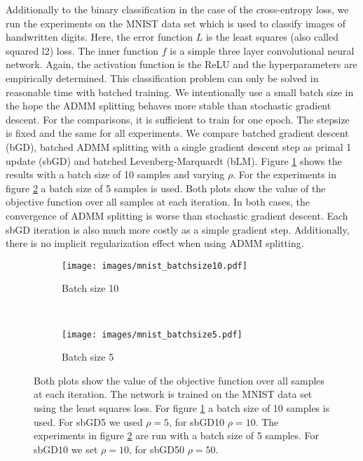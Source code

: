 \documentclass[english,11pt,a4paper]{article}
\begin{document}
Additionally to the binary classification in the case of the cross-entropy loss, we run the experiments on the MNIST data set which is used to classify images of handwritten digits. Here, the error function $L$ is the least squares (also called squared l2) loss. The inner function $f$ is a simple three layer convolutional neural network. Again, the activation function is the ReLU and the hyperparameters are empirically determined. This classification problem can only be solved in reasonable time with batched training. We intentionally use a small batch size in the hope the ADMM splitting behaves more stable than stochastic gradient descent. For the comparisons, it is sufficient to train for one epoch. The stepsize is fixed and the same for all experiments. We compare batched gradient descent (bGD), batched ADMM splitting with a single gradient descent step as primal 1 update (sbGD) and batched Levenberg-Marquardt (bLM). Figure \ref{fig:mnist_batchsize10} shows the results with a batch size of 10 samples and varying $\rho$. For the experiments in figure \ref{fig:mnist_batchsize5} a batch size of 5 samples is used. Both plots show the value of the objective function over all samples at each iteration. In both cases, the convergence of ADMM splitting is worse than stochastic gradient descent. Each sbGD iteration is also much more costly as a simple gradient step. Additionally, there is no implicit regularization effect when using ADMM splitting.

\begin{figure}[t]
	\centering
	\begin{subfigure}[b]{0.5\textwidth}
		\texttt{[image: images/mnist\_batchsize10.pdf]}
		\caption{Batch size 10}
		\label{fig:mnist_batchsize10}
	\end{subfigure}
	~
	\begin{subfigure}[b]{0.5\textwidth}
		\texttt{[image: images/mnist\_batchsize5.pdf]}
		\caption{Batch size 5}
		\label{fig:mnist_batchsize5}
	\end{subfigure}

	\caption{Both plots show the value of the objective function over all samples at each iteration. The network is trained on the MNIST data set using the least squares loss. For figure \ref{fig:mnist_batchsize10} a batch size of 10 samples is used. For sbGD5 we used $\rho=5$, for sbGD10 $\rho=10$. The experiments in figure \ref{fig:mnist_batchsize5} are run with a batch size of 5 samples. For sbGD10 we set $\rho=10$, for sbGD50 $\rho=50$.}
	
	\label{fig:results_mnist}
\end{figure}


\pagebreak

\printbibliography
\end{document}

